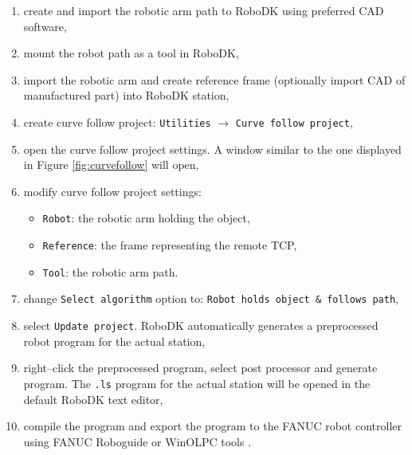 \begin{enumerate}

\item create and import the robotic arm path to RoboDK using preferred CAD software,

\item mount the robot path as a tool in RoboDK,

\item import the robotic arm and create reference frame (optionally import CAD of manufactured part) into RoboDK station, 

\item create curve follow project: \texttt{Utilities} $\rightarrow$ \texttt{Curve follow project},

\item open the curve follow project settings. A window similar to the one displayed in Figure \ref{fig:curvefollow} will open, 

\item modify curve follow project settings:

    \begin{itemize}

        \item \texttt{Robot}: the robotic arm holding the object,
        \item \texttt{Reference}: the frame representing the remote TCP,
        \item \texttt{Tool}: the robotic arm path.
        
    \end{itemize}
    
\item change \texttt{Select algorithm} option to: \texttt{Robot holds object & follows path},

\item select \texttt{Update project}. RoboDK automatically generates a preprocessed robot program for the actual station,

\item right--click the preprocessed program, select post processor and generate program. The \texttt{.ls} program for the actual station will be opened in the default RoboDK text editor,

\item compile the program and export the program to the FANUC robot controller using FANUC Roboguide or WinOLPC tools \cite{curvefollow}.
    
\end{enumerate}

